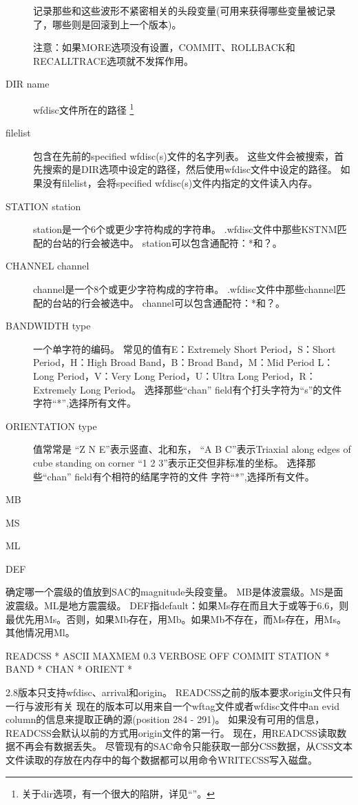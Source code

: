 \begin{description}
    记录那些和这些波形不紧密相关的头段变量(可用来获得哪些变量被记录了，哪些则是回滚到上一个版本)。%

    注意：如果MORE选项没有设置，COMMIT、ROLLBACK和RECALLTRACE选项就不发挥作用。%
\item [DIR name] wfdisc文件所在的路径
    \footnote{关于dir选项，有一个很大的陷阱，详见``''。}
\item [filelist] 包含在先前的specified wfdisc(s)文件的名字列表。%
    这些文件会被搜索，首先搜索的是DIR选项中设定的路径，然后使用wfdisc文件中设定的路径。
    如果没有filelist，会将specified wfdisc(s)文件内指定的文件读入内存。
\item[STATION station]station是一个6个或更少字符构成的字符串。
    .wfdisc文件中那些KSTNM匹配的台站的行会被选中。
    station可以包含通配符：*和？。
\item[CHANNEL channel]channel是一个8个或更少字符构成的字符串。
    .wfdisc文件中那些channel匹配的台站的行会被选中。
    channel可以包含通配符：*和？。
\item [BANDWIDTH type] 一个单字符的编码。
    常见的值有E：Extremely Short Period，S：Short Period，H：High Broad Band，B：Broad Band，M：Mid Period
    L：Long Period，V：Very Long Period，U：Ultra Long Period，R：Extremely Long Period。
    选择那些``chan'' field有个打头字符为``s''的文件%
    字符``*'',选择所有文件。
\item [ORIENTATION type]值常常是
    ``Z N E''表示竖直、北和东，
    ``A B C''表示Triaxial along edges of cube standing on corner%
    ``1 2 3''表示正交但非标准的坐标。
    选择那些``chan'' field有个相符的结尾字符的文件%
    字符``*'',选择所有文件。
\end{description}
MB

MS

ML

DEF

确定哪一个震级的值放到SAC的magnitude头段变量。
MB是体波震级。MS是面波震级。ML是地方震震级。
DEF指default：如果Ms存在而且大于或等于6.6，则最优先用Ms。否则，如果Mb存在，用Mb。如果Mb不存在，而Ms存在，用Ms。其他情况用Ml。%
\begin{SACSTX}
READCSS * ASCII MAXMEM 0.3 VERBOSE OFF COMMIT STATION * BAND * CHAN * ORIENT *
\end{SACSTX}
2.8版本只支持wfdisc、arrival和origin。
READCSS之前的版本要求origin文件只有一行与波形有关%
现在的版本可以用来自一个wftag文件或者wfdisc文件中an evid column的信息来提取正确的源(position 284 - 291)。%
如果没有可用的信息，READCSS会默认以前的方式用origin文件的第一行。
现在，用READCSS读取数据不再会有数据丢失。
尽管现有的SAC命令只能获取一部分CSS数据，从CSS文本文件读取的存放在内存中的每个数据都可以用命令WRITECSS写入磁盘。

